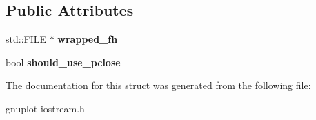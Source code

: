 \subsection*{Public Attributes}
\begin{DoxyCompactItemize}
\item 
\mbox{\label{structgnuplotio_1_1FileHandleWrapper_adcb58bfcd9dbdba000a7e7395bee2ef9}} 
std\+::\+F\+I\+LE $\ast$ {\bfseries wrapped\+\_\+fh}
\item 
\mbox{\label{structgnuplotio_1_1FileHandleWrapper_a11b63ed64cf53167e26c5273778d90ea}} 
bool {\bfseries should\+\_\+use\+\_\+pclose}
\end{DoxyCompactItemize}


The documentation for this struct was generated from the following file\+:\begin{DoxyCompactItemize}
\item 
gnuplot-\/iostream.\+h\end{DoxyCompactItemize}
